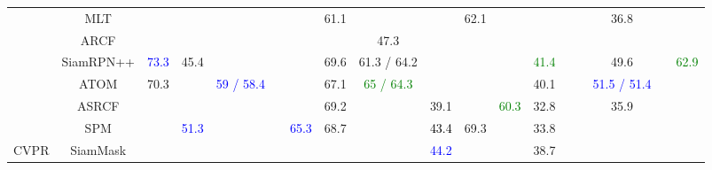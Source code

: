 \documentclass[10pt,twocolumn,letterpaper]{article}
\begin{document}
\begin{table*}[t]
\begin{tabular}{cccccccccccccccccc}
 & MLT \cite{Choi19ICCV} &  &  &  &  &  & 61.1 &  &  & 62.1 &  &  &  &  & 36.8 &  & \tabularnewline
\cmidrule{2-18} \cmidrule{3-18} \cmidrule{4-18} \cmidrule{5-18} \cmidrule{6-18} \cmidrule{7-18} \cmidrule{8-18} \cmidrule{9-18} \cmidrule{10-18} \cmidrule{11-18} \cmidrule{12-18} \cmidrule{13-18} \cmidrule{14-18} \cmidrule{15-18} \cmidrule{16-18} \cmidrule{17-18} \cmidrule{18-18} 
 & ARCF \cite{Huang19ICCVAberrance} &  &  &  &  &  &  & 47.3 &  &  &  &  &  &  &  &  & \tabularnewline
\midrule
 & SiamRPN++ \cite{Li19CVPR} & \textcolor{blue}{73.3} & 45.4 &  &  &  & 69.6 & 61.3 / 64.2 &  &  &  & \textcolor{green}{41.4} &  &  & 49.6 &  & \textcolor{green}{62.9}\tabularnewline
\cmidrule{2-18} \cmidrule{3-18} \cmidrule{4-18} \cmidrule{5-18} \cmidrule{6-18} \cmidrule{7-18} \cmidrule{8-18} \cmidrule{9-18} \cmidrule{10-18} \cmidrule{11-18} \cmidrule{12-18} \cmidrule{13-18} \cmidrule{14-18} \cmidrule{15-18} \cmidrule{16-18} \cmidrule{17-18} \cmidrule{18-18} 
 & ATOM \cite{Danelljan19CVPR} & 70.3 &  & \textcolor{blue}{59 / 58.4} &  &  & 67.1 & \textcolor{green}{65 / 64.3} &  &  &  & 40.1 &  &  & \textcolor{blue}{51.5 / 51.4} &  & \tabularnewline
\cmidrule{2-18} \cmidrule{3-18} \cmidrule{4-18} \cmidrule{5-18} \cmidrule{6-18} \cmidrule{7-18} \cmidrule{8-18} \cmidrule{9-18} \cmidrule{10-18} \cmidrule{11-18} \cmidrule{12-18} \cmidrule{13-18} \cmidrule{14-18} \cmidrule{15-18} \cmidrule{16-18} \cmidrule{17-18} \cmidrule{18-18} 
 & ASRCF \cite{Dai19CVPR} &  &  &  &  &  & 69.2 &  & 39.1 &  & \textcolor{green}{60.3} & 32.8 &  &  & 35.9 &  & \tabularnewline
\cmidrule{2-18} \cmidrule{3-18} \cmidrule{4-18} \cmidrule{5-18} \cmidrule{6-18} \cmidrule{7-18} \cmidrule{8-18} \cmidrule{9-18} \cmidrule{10-18} \cmidrule{11-18} \cmidrule{12-18} \cmidrule{13-18} \cmidrule{14-18} \cmidrule{15-18} \cmidrule{16-18} \cmidrule{17-18} \cmidrule{18-18} 
 & SPM \cite{wang2019spm} &  & \textcolor{blue}{51.3} &  &  & \textcolor{blue}{65.3} & 68.7 &  & \textcolor{black}{43.4} & 69.3 &  & 33.8 &  &  &  &  & \tabularnewline
\cmidrule{2-18} \cmidrule{3-18} \cmidrule{4-18} \cmidrule{5-18} \cmidrule{6-18} \cmidrule{7-18} \cmidrule{8-18} \cmidrule{9-18} \cmidrule{10-18} \cmidrule{11-18} \cmidrule{12-18} \cmidrule{13-18} \cmidrule{14-18} \cmidrule{15-18} \cmidrule{16-18} \cmidrule{17-18} \cmidrule{18-18} 
CVPR & SiamMask \cite{Wang19CVPR} &  &  &  &  &  &  &  & \textcolor{blue}{44.2} &  &  & 38.7 &  &  &  &  & \tabularnewline
\cmidrule{2-18} \cmidrule{3-18} \cmidrule{4-18} \cmidrule{5-18} \cmidrule{6-18} \cmidrule{7-18} \cmidrule{8-18} \cmidrule{9-18} \cmidrule{10-18} \cmidrule{11-18} \cmidrule{12-18} \cmidrule{13-18} \cmidrule{14-18} \cmidrule{15-18} \cmidrule{16-18} \cmidrule{17-18} \cmidrule{18-18} 

\end{tabular}
\end{table*}
\end{document}
